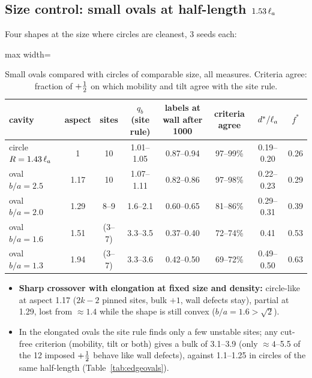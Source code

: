 \subsection{Size control: small ovals at half-length $1.53\,\ell_a$}
Four shapes at the size where circles are cleanest, 3 seeds each:
\begin{table}[H]\centering\small
\caption{Small ovals compared with circles of comparable size, all measures. Criteria agree: fraction of $+\tfrac12$ on which
mobility and tilt agree with the site rule.}\label{tab:p3}
\begin{adjustbox}{max width=\textwidth}
\begin{tabular}{lccccccc}\toprule
cavity & aspect & sites & $q_b$ (site rule) & labels at wall after 1000 & criteria agree & $d^*/\ell_a$ & $f^*$\\\midrule
circle $R=1.43\,\ell_a$ & 1 & 10 & 1.01--1.05 & 0.87--0.94 & 97--99\% & 0.19--0.20 & 0.26\\
oval $b/a=2.5$ & 1.17 & 10 & 1.07--1.11 & 0.82--0.86 & 97--98\% & 0.22--0.23 & 0.29\\
oval $b/a=2.0$ & 1.29 & 8--9 & 1.6--2.1 & 0.60--0.65 & 81--86\% & 0.29--0.31 & 0.39\\
oval $b/a=1.6$ & 1.51 & (3--7) & 3.3--3.5 & 0.37--0.40 & 72--74\% & 0.41 & 0.53\\
oval $b/a=1.3$ & 1.94 & (3--7) & 3.3--3.6 & 0.42--0.50 & 69--72\% & 0.49--0.50 & 0.63\\\bottomrule
\end{tabular}
\end{adjustbox}
\end{table}
\begin{itemize}
  \item \textbf{Sharp crossover with elongation at fixed size and density:} circle-like at aspect 1.17 ($2k-2$ pinned sites, bulk $+1$,
        wall defects stay), partial at 1.29, lost from $\approx1.4$ while the shape is still convex ($b/a=1.6>\sqrt2$).
  \item In the elongated ovals the site rule finds only a few unstable sites; any cut-free criterion (mobility, tilt or both) gives a
        bulk of 3.1--3.9 (only $\approx4$--5.5 of the 12 imposed $+\tfrac12$ behave like wall defects), against 1.1--1.25 in circles of
        the same half-length (Table~\ref{tab:edgeovals}).
\end{itemize}
